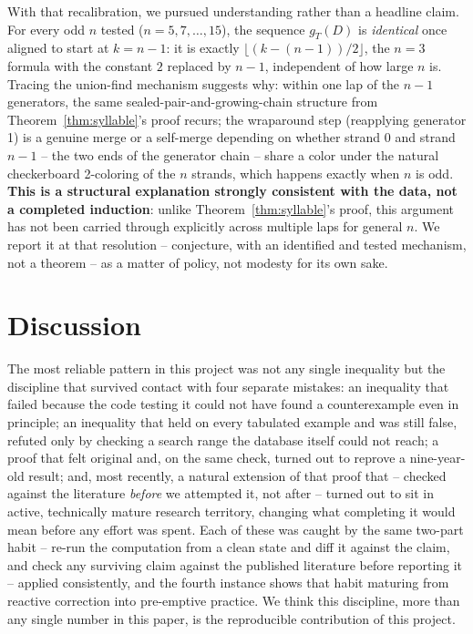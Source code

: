 \documentclass[11pt]{article}
\theoremstyle{definition}
\begin{document}
With that recalibration, we pursued understanding rather than a headline claim. For every odd $n$ tested ($n=5,7,\ldots,15$), the sequence $g_T(D)$ is \emph{identical} once aligned to start at $k=n-1$: it is exactly $\lfloor (k-(n-1))/2 \rfloor$, the $n=3$ formula with the constant $2$ replaced by $n-1$, independent of how large $n$ is. Tracing the union-find mechanism suggests why: within one lap of the $n-1$ generators, the same sealed-pair-and-growing-chain structure from Theorem~\ref{thm:syllable}'s proof recurs; the wraparound step (reapplying generator 1) is a genuine merge or a self-merge depending on whether strand $0$ and strand $n-1$ -- the two ends of the generator chain -- share a color under the natural checkerboard 2-coloring of the $n$ strands, which happens exactly when $n$ is odd. \textbf{This is a structural explanation strongly consistent with the data, not a completed induction}: unlike Theorem~\ref{thm:syllable}'s proof, this argument has not been carried through explicitly across multiple laps for general $n$. We report it at that resolution -- conjecture, with an identified and tested mechanism, not a theorem -- as a matter of policy, not modesty for its own sake.

\section{Discussion}
\label{sec:discussion}

The most reliable pattern in this project was not any single inequality but the discipline that survived contact with four separate mistakes: an inequality that failed because the code testing it could not have found a counterexample even in principle; an inequality that held on every tabulated example and was still false, refuted only by checking a search range the database itself could not reach; a proof that felt original and, on the same check, turned out to reprove a nine-year-old result; and, most recently, a natural extension of that proof that -- checked against the literature \emph{before} we attempted it, not after -- turned out to sit in active, technically mature research territory, changing what completing it would mean before any effort was spent. Each of these was caught by the same two-part habit -- re-run the computation from a clean state and diff it against the claim, and check any surviving claim against the published literature before reporting it -- applied consistently, and the fourth instance shows that habit maturing from reactive correction into pre-emptive practice. We think this discipline, more than any single number in this paper, is the reproducible contribution of this project.
\end{document}
